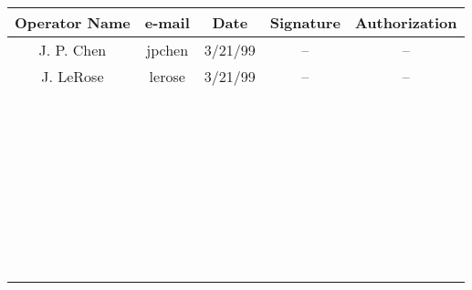 \begin{center}
\begin{tabular}{|c|c|c|c|c|}
\hline 
Operator Name&e-mail&
 Date&
 Signature&
 Authorization\\
\hline 
J. P. Chen&jpchen&
 3/21/99&
 --&
 --\\
\hline 
J. LeRose&lerose&
 3/21/99&
 --&
 --\\
\hline 
&&
&
&
\\
\hline 
&&
&
&
\\
\hline 
&&
&
&
\\
\hline 
&&
&
&
\\
\hline 
&&
&
&
\\
\hline 
&&
&
&
\\
\hline 
&&
&
&
\\
\hline 
&&
&
&
\\
\hline 
&&
&
&
\\
\hline 
&&
&
&
\\
\hline 
&&
&
&
\\
\hline 
&&
&
&
\\
\hline 
&&
&
&
\\
\hline 
&&
&
&
\\
\hline 
&&
&
&
\\
\hline 
&&
&
&
\\
\hline 
&&
&
&
\\
\hline 
&&
&
&
\\
\hline 
&&
&
&
\\
\hline 
&&
&
&
\\
\hline 
&&
&
&
\\
\hline 
&&
&
&
\\
\hline 
&&
&
&
\\
\hline 
&&
&
&
\\
\hline 
&&
&
&
\\
\hline 
&&
&
&
\\
\hline 
&&
&
&
\\
\hline 
&&
&
&
\\
\hline 
&&
&
&
\\
\hline 
&&
&
&
\\
\hline 
&&
&
&
\\
\hline 
&&
&
&
\\
\hline 
&&
&
&
\\
\hline 
&&
&
&
\\
\hline 
&&
&
&
 \\
\hline 
\end{tabular}
\end{center}

\vspace{0.3cm}

